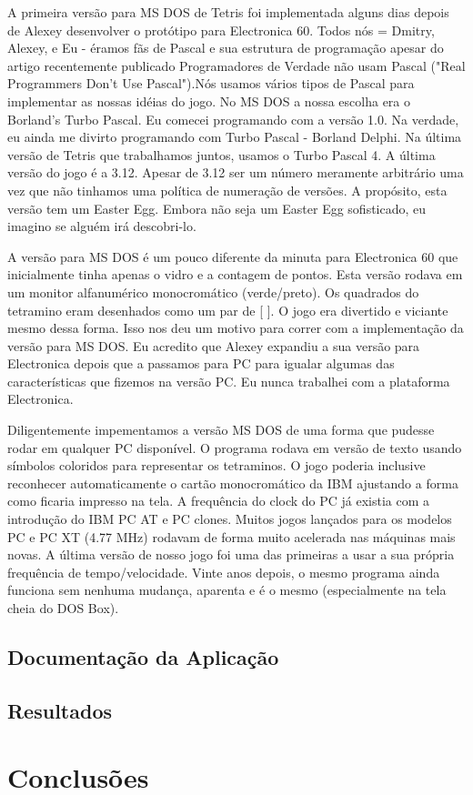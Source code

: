 \documentclass[
	12pt,				%
	openright,			%
	oneside,			%
	a4paper,			%
	brazil,				%
	]{abntex2}
\begin{document}
A primeira versão para MS DOS de Tetris foi implementada alguns dias depois de Alexey desenvolver o protótipo para Electronica 60. Todos nós = Dmitry, Alexey, e Eu - éramos fãs de Pascal e sua estrutura de programação apesar do artigo recentemente publicado Programadores de Verdade não usam Pascal ("Real Programmers Don't Use Pascal").Nós usamos vários tipos de Pascal para implementar as nossas idéias do jogo. No MS DOS a nossa escolha era o Borland's Turbo Pascal. Eu comecei programando com a versão 1.0. Na verdade, eu ainda me divirto programando com Turbo Pascal - Borland Delphi. Na última versão de Tetris que trabalhamos juntos, usamos o Turbo Pascal 4. A última versão do jogo é a 3.12. Apesar de 3.12 ser um número meramente arbitrário uma vez que não tinhamos uma política de numeração de versões. A propósito, esta versão tem um Easter Egg. Embora não seja um Easter Egg sofisticado, eu imagino se alguém irá descobri-lo.

A versão para MS DOS é um pouco diferente da minuta para Electronica 60 que inicialmente tinha apenas o vidro e a contagem de pontos. Esta versão rodava em um monitor alfanumérico monocromático (verde/preto). Os quadrados do tetramino eram desenhados como um par de [ ]. O jogo era divertido e viciante mesmo dessa forma. Isso nos deu um motivo para correr com a implementação da versão para MS DOS. Eu acredito que Alexey expandiu a sua versão para Electronica depois que a passamos para PC para igualar algumas das características que fizemos na versão PC. Eu nunca trabalhei com a plataforma Electronica.

Diligentemente impementamos a versão MS DOS de uma forma que pudesse rodar em qualquer PC disponível. O programa rodava em versão de texto usando símbolos coloridos para representar os tetraminos. O jogo poderia inclusive reconhecer automaticamente o cartão monocromático da IBM ajustando a forma como ficaria impresso na tela. A frequência do clock do PC já existia com a introdução do IBM PC AT e PC clones. Muitos jogos lançados para os modelos PC e PC XT (4.77 MHz) rodavam de forma muito acelerada nas máquinas mais novas. A última versão de nosso jogo foi uma das primeiras a usar a sua própria frequência de tempo/velocidade. Vinte anos depois, o mesmo programa ainda funciona sem nenhuma mudança, aparenta e é o mesmo (especialmente na tela cheia do DOS Box).

\section{Documentação da Aplicação}

\section{Resultados}

\chapter{Conclusões}
\end{document}
